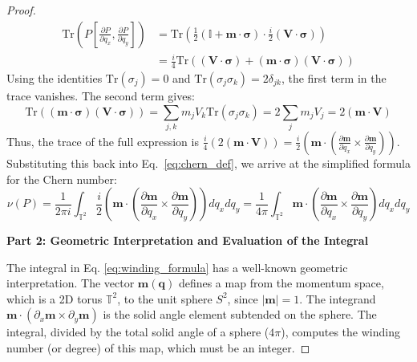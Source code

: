 \begin{proof}
\begin{align*}
\text{Tr}\left( P \left[ \frac{\partial P}{\partial q_x}, \frac{\partial P}{\partial q_y} \right] \right) &= \text{Tr}\left( \frac{1}{2}(\mathbb{I} + \mathbf{m} \cdot \boldsymbol{\sigma}) \cdot \frac{i}{2} (\mathbf{V} \cdot \boldsymbol{\sigma}) \right) \\
&= \frac{i}{4} \text{Tr}\left( (\mathbf{V} \cdot \boldsymbol{\sigma}) + (\mathbf{m} \cdot \boldsymbol{\sigma})(\mathbf{V} \cdot \boldsymbol{\sigma}) \right)
\end{align*}
Using the identities $\text{Tr}(\sigma_j)=0$ and $\text{Tr}(\sigma_j \sigma_k)=2\delta_{jk}$, the first term in the trace vanishes. The second term gives:
$$ \text{Tr}\left( (\mathbf{m} \cdot \boldsymbol{\sigma})(\mathbf{V} \cdot \boldsymbol{\sigma}) \right) = \sum_{j,k} m_j V_k \text{Tr}(\sigma_j \sigma_k) = 2 \sum_j m_j V_j = 2 (\mathbf{m} \cdot \mathbf{V}) $$
Thus, the trace of the full expression is $\frac{i}{4} \left( 2 (\mathbf{m} \cdot \mathbf{V}) \right) = \frac{i}{2} \left( \mathbf{m} \cdot \left( \frac{\partial \mathbf{m}}{\partial q_x} \times \frac{\partial \mathbf{m}}{\partial q_y} \right) \right)$.
Substituting this back into Eq.~\eqref{eq:chern_def}, we arrive at the simplified formula for the Chern number:
\begin{equation}
\nu(P) = \frac{1}{2\pi i} \int_{\mathbb{T}^2} \frac{i}{2} \left( \mathbf{m} \cdot \left(\frac{\partial \mathbf{m}}{\partial q_x} \times \frac{\partial \mathbf{m}}{\partial q_y}\right) \right) dq_x dq_y = \frac{1}{4\pi} \int_{\mathbb{T}^2} \mathbf{m} \cdot \left(\frac{\partial \mathbf{m}}{\partial q_x} \times \frac{\partial \mathbf{m}}{\partial q_y}\right) dq_x dq_y
\label{eq:winding_formula}
\end{equation}

\textbf{Part 2: Geometric Interpretation and Evaluation of the Integral}

The integral in Eq. \eqref{eq:winding_formula} has a well-known geometric interpretation. The vector $\mathbf{m}(\mathbf{q})$ defines a map from the momentum space, which is a 2D torus $\mathbb{T}^2$, to the unit sphere $S^2$, since $|\mathbf{m}|=1$. The integrand $\mathbf{m} \cdot (\partial_x \mathbf{m} \times \partial_y \mathbf{m})$ is the solid angle element subtended on the sphere. The integral, divided by the total solid angle of a sphere ($4\pi$), computes the winding number (or degree) of this map, which must be an integer.


\end{proof}
